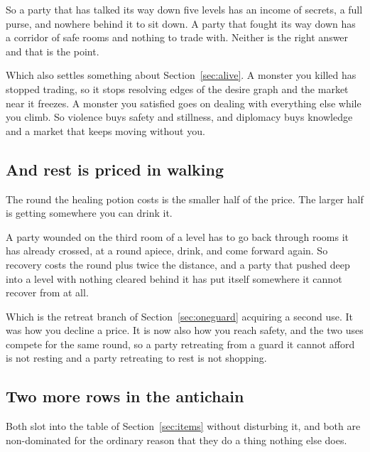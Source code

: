 \documentclass[11pt,a4paper]{article}
\begin{document}
So a party that has talked its way down five levels has an income of secrets, a full purse, and
nowhere behind it to sit down. A party that fought its way down has a corridor of safe rooms and
nothing to trade with. Neither is the right answer and that is the point.

\begin{alarmbox}
Which also settles something about Section~\ref{sec:alive}. A monster you killed has stopped
trading, so it stops resolving edges of the desire graph and the market near it freezes. A monster
you satisfied goes on dealing with everything else while you climb. So violence buys safety and
stillness, and diplomacy buys knowledge and a market that keeps moving without you.
\end{alarmbox}

\subsection{And rest is priced in walking}

The round the healing potion costs is the smaller half of the price. The larger half is getting somewhere
you can drink it.

A party wounded on the third room of a level has to go back through rooms it has already crossed,
at a round apiece, drink, and come forward again. So recovery costs the round plus twice the
distance, and a party that pushed deep into a level with nothing cleared behind it has put itself
somewhere it cannot recover from at all.

\begin{sectionbox}
Which is the retreat branch of Section~\ref{sec:oneguard} acquiring a second use. It was how you
decline a price. It is now also how you reach safety, and the two uses compete for the same round,
so a party retreating from a guard it cannot afford is not resting and a party retreating to rest
is not shopping.
\end{sectionbox}

\subsection{Two more rows in the antichain}

Both slot into the table of Section~\ref{sec:items} without disturbing it, and both are
non-dominated for the ordinary reason that they do a thing nothing else does.
\end{document}
